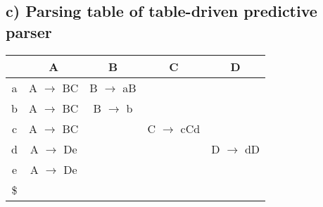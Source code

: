 \documentclass[12pt, A4]{article}
\begin{document}
    \newpage
	\subsection*{c) Parsing table of table-driven predictive parser}
	
	\begin{tabular}{|c|c|c|c|c|}
		\hline 
		   & A & B & C & D \\ 
		\hline 
		a  & A $\rightarrow$ BC & B $\rightarrow$ aB &  &  \\ 
		\hline 
		b  & A $\rightarrow$ BC & B $\rightarrow$ b  &  &  \\ 
		\hline 
		c  & A $\rightarrow$ BC & & C $\rightarrow$ cCd &  \\ 
		\hline 
		d  & A $\rightarrow$ De & & & D $\rightarrow$ dD \\ 
		\hline 
		e  & A $\rightarrow$ De & & &  \\ 
		\hline 
		\$ &  &  &  &  \\ 
		\hline 
	\end{tabular} 
	
\end{document}
